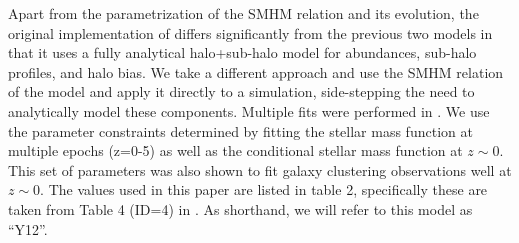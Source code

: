 \documentclass[a4paper,fleqn,usenatbib]{mnras}
\begin{document}
Apart from the parametrization of the SMHM relation and its evolution, the original implementation of \cite{Yang:2012ew} differs significantly from the previous two models in that it uses a fully analytical halo+sub-halo model for abundances, sub-halo profiles, and halo bias.  We take a different approach and use the SMHM relation of the model and apply it directly to a simulation, side-stepping the need to analytically model these components.  Multiple fits were performed in \citet[][]{Yang:2012ew}.  We use the parameter constraints determined by fitting the stellar mass function at multiple epochs (z=0-5) as well as the conditional stellar mass function at $z \sim 0$.  This set of parameters was also shown to fit galaxy clustering observations well at $z\sim 0$.  The values used in this paper are listed in table 2, specifically these are taken from Table 4 (ID=4) in \citet[][]{Yang:2012ew}.  As shorthand, we will refer to this model as ``Y12''.
\end{document}
